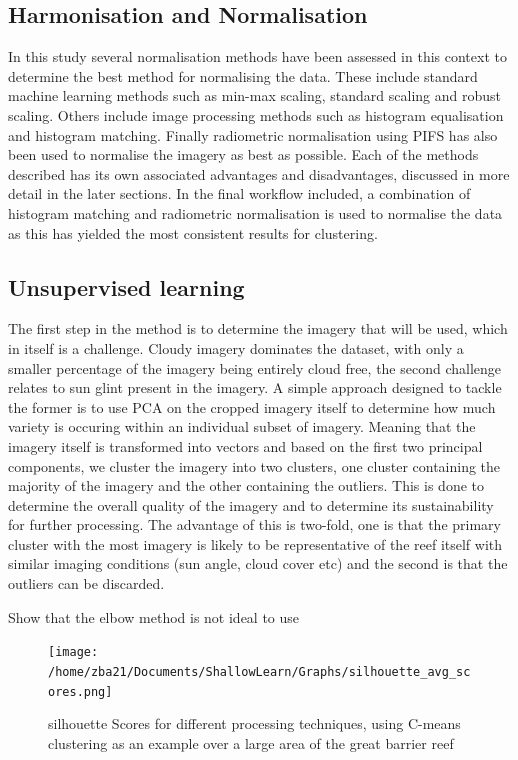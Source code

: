 \documentclass[journal,article,submit,pdftex,moreauthors]{Definitions/mdpi}
\begin{document}
\subsection*{Harmonisation and Normalisation}
In this study several normalisation methods have been assessed in this context to determine the best method for normalising the data. These include standard machine learning methods such as min-max scaling, standard scaling and robust scaling. Others include
image processing methods such as histogram equalisation and histogram matching. Finally radiometric normalisation using PIFS has also been used to normalise the imagery as best as possible. Each of the methods described has its own associated advantages and disadvantages, 
discussed in more detail in the later sections. In the final workflow included, a combination of histogram matching and radiometric normalisation is used to normalise the data as this has yielded the most consistent results for clustering. 



\subsection*{Unsupervised learning}
The first step in the method is to determine the imagery that will be used, which in itself is a challenge. Cloudy imagery dominates the dataset, with only a smaller percentage of the imagery being entirely cloud free, the second challenge relates to sun glint present
in the imagery. A simple approach designed to tackle the former is to use PCA on the cropped imagery itself to determine how much variety is occuring within an individual subset of imagery. Meaning that the imagery itself is transformed into vectors
and based on the first two principal components, we cluster the imagery into two clusters, one cluster containing the majority of the imagery and the other containing the outliers. This is done to determine the overall quality of the imagery and to determine its sustainability
for further processing. The advantage of this is two-fold, one is that the primary cluster with the most imagery is likely to be representative of the reef itself with similar imaging conditions (sun angle, cloud cover etc) and the second is that the outliers can be discarded. 

\cite{Schubert_2023} Show that the elbow method is not ideal to use 

\begin{figure}
	\centering
	\texttt{[image: /home/zba21/Documents/ShallowLearn/Graphs/silhouette\_avg\_scores.png]}
	\caption{silhouette Scores for different processing techniques, using C-means clustering as an example over a large area of the great barrier reef}
	\label{fig:silhouette_scores_different_preproc}
\end{figure}
\end{document}
